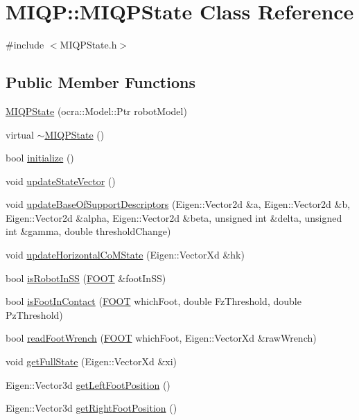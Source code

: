 \hypertarget{classMIQP_1_1MIQPState}{\section{\-M\-I\-Q\-P\-:\-:\-M\-I\-Q\-P\-State \-Class \-Reference}
\label{classMIQP_1_1MIQPState}
}


{\ttfamily \#include $<$\-M\-I\-Q\-P\-State.\-h$>$}

\subsection*{\-Public \-Member \-Functions}
\begin{DoxyCompactItemize}
\item 
\hyperlink{classMIQP_1_1MIQPState_aaaf6b0ca121e6a74b61605634dbb5fc3}{\-M\-I\-Q\-P\-State} (ocra\-::\-Model\-::\-Ptr robot\-Model)
\item 
virtual \hyperlink{classMIQP_1_1MIQPState_a1f2f14c183d11b3a1e323b59fe47020b}{$\sim$\-M\-I\-Q\-P\-State} ()
\item 
bool \hyperlink{classMIQP_1_1MIQPState_adbae9a43d4d510e0873995bf0016d75a}{initialize} ()
\item 
void \hyperlink{classMIQP_1_1MIQPState_a149d9bd8fd8208734e66a5f945cfe39a}{update\-State\-Vector} ()
\item 
void \hyperlink{classMIQP_1_1MIQPState_a8dec06cabde0ad186c976c0bc61c4688}{update\-Base\-Of\-Support\-Descriptors} (\-Eigen\-::\-Vector2d \&a, \-Eigen\-::\-Vector2d \&b, \-Eigen\-::\-Vector2d \&alpha, \-Eigen\-::\-Vector2d \&beta, unsigned int \&delta, unsigned int \&gamma, double threshold\-Change)
\item 
void \hyperlink{classMIQP_1_1MIQPState_a91a2e7b0415bf56fdb26625eacf106ef}{update\-Horizontal\-Co\-M\-State} (\-Eigen\-::\-Vector\-Xd \&hk)
\item 
bool \hyperlink{classMIQP_1_1MIQPState_ac098f6c3e6b585c45a5dc24d455f15c2}{is\-Robot\-In\-S\-S} (\hyperlink{utils_8h_a4b6a8e135f90bd56e5a57a60efb42529}{\-F\-O\-O\-T} \&foot\-In\-S\-S)
\item 
bool \hyperlink{classMIQP_1_1MIQPState_abc509a2d35f1d97a9ebcd1352943dadc}{is\-Foot\-In\-Contact} (\hyperlink{utils_8h_a4b6a8e135f90bd56e5a57a60efb42529}{\-F\-O\-O\-T} which\-Foot, double \-Fz\-Threshold, double \-Pz\-Threshold)
\item 
bool \hyperlink{classMIQP_1_1MIQPState_a3710c3ded4a5da84c505ee8e052021a3}{read\-Foot\-Wrench} (\hyperlink{utils_8h_a4b6a8e135f90bd56e5a57a60efb42529}{\-F\-O\-O\-T} which\-Foot, \-Eigen\-::\-Vector\-Xd \&raw\-Wrench)
\item 
void \hyperlink{classMIQP_1_1MIQPState_ae1d43385c4b25dced6952ffdfbf5043a}{get\-Full\-State} (\-Eigen\-::\-Vector\-Xd \&xi)
\item 
\-Eigen\-::\-Vector3d \hyperlink{classMIQP_1_1MIQPState_a7a6c0d1fc5b3fb66d321867f9618e013}{get\-Left\-Foot\-Position} ()
\item 
\-Eigen\-::\-Vector3d \hyperlink{classMIQP_1_1MIQPState_afd73d24a2c94e32686160874c66b6b55}{get\-Right\-Foot\-Position} ()
\end{DoxyCompactItemize}
